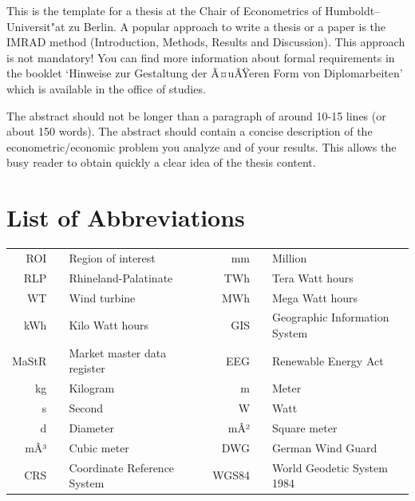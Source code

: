\documentclass[a4paper,11pt]{article}
\begin{document}
This is the template for a thesis at the Chair of Econometrics of
Humboldt--Universit"at zu Berlin. A popular approach to write a thesis or a
paper is the IMRAD method (Introduction, Methods, Results and Discussion). This
approach is not mandatory! You can find more information about formal
requirements in the booklet `Hinweise zur Gestaltung der Ã¤uÃŸeren Form von
Diplomarbeiten' which is available in the office of studies.

The abstract should not be longer than a paragraph of around 10-15 lines (or
about 150 words). The abstract should contain a concise description of the
econometric/economic problem you analyze and of your results. This allows the
busy reader to obtain quickly a clear idea of the thesis content.

\newpage
\hypertarget{list-of-abbreviations}{%
\section*{List of Abbreviations}\label{list-of-abbreviations}}
\begin{tabular}{rp{0.2cm}lp{1cm}rp{0.2cm}l}
    ROI     & &  Region of interest           & & mm      & &  Million \\   
    RLP     & &  Rhineland-Palatinate         & & TWh     & &  Tera Watt hours  \\
    WT      & &  Wind turbine                 & & MWh     & &  Mega Watt hours \\
    kWh     & &  Kilo Watt hours              & & GIS     & &  Geographic Information System \\
    MaStR   & &  Market master data register  & & EEG     & &  Renewable Energy Act \\
    kg      & &  Kilogram                     & & m       & &  Meter \\
    s       & &  Second                       & & W       & &  Watt \\
    d       & &  Diameter                     & & mÂ²      & &  Square meter \\
    mÂ³      & &  Cubic meter                  & & DWG     & &  German Wind Guard \\
    CRS     & &  Coordinate Reference System  & & WGS84   & &  World Geodetic System 1984 \\ 
    
\end{tabular}
\newpage
\listoffigures
{}
\end{document}

